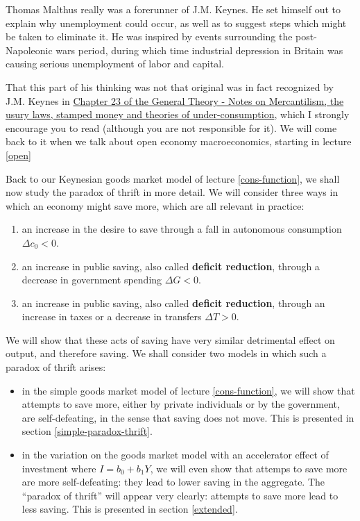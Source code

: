 \documentclass[]{book}
\begin{document}
Thomas Malthus really was a forerunner of J.M. Keynes. He set himself
out to explain why unemployment could occur, as well as to suggest steps
which might be taken to eliminate it. He was inspired by events
surrounding the post-Napoleonic wars period, during which time
industrial depression in Britain was causing serious unemployment of
labor and capital.

That this part of his thinking was not that original was in fact
recognized by J.M. Keynes in
\href{http://cas2.umkc.edu/economics/people/facultypages/kregel/courses/econ645/winter2011/generaltheory.pdf}{Chapter
23 of the General Theory - Notes on Mercantilism, the usury laws,
stamped money and theories of under-consumption}, which I strongly
encourage you to read (although you are not responsible for it). We will
come back to it when we talk about open economy macroeconomics, starting
in lecture \ref{open}

Back to our Keynesian goods market model of lecture \ref{cons-function},
we shall now study the paradox of thrift in more detail. We will
consider three ways in which an economy might save more, which are all
relevant in practice:

\begin{enumerate}
\def\labelenumi{\arabic{enumi}.}
\item
  an increase in the desire to save through a fall in autonomous
  consumption \(\Delta c_0<0\).
\item
  an increase in public saving, also called \textbf{deficit reduction},
  through a decrease in government spending \(\Delta G<0\).
\item
  an increase in public saving, also called \textbf{deficit reduction},
  through an increase in taxes or a decrease in transfers
  \(\Delta T>0\).
\end{enumerate}

We will show that these acts of saving have very similar detrimental
effect on output, and therefore saving. We shall consider two models in
which such a paradox of thrift arises:

\begin{itemize}
\item
  in the simple goods market model of lecture \ref{cons-function}, we
  will show that attempts to save more, either by private individuals or
  by the government, are self-defeating, in the sense that saving does
  not move. This is presented in section \ref{simple-paradox-thrift}.
\item
  in the variation on the goods market model with an accelerator effect
  of investment where \(I=b_0+b_1Y\), we will even show that attemps to
  save more are more self-defeating: they lead to lower saving in the
  aggregate. The ``paradox of thrift'' will appear very clearly:
  attempts to save more lead to less saving. This is presented in
  section \ref{extended}.
\end{itemize}
\end{document}
